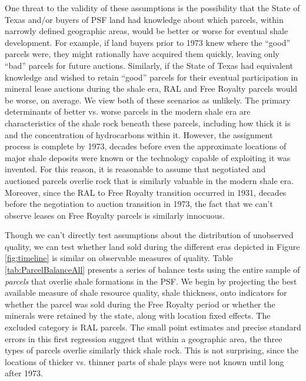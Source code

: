 One threat to the validity of these assumptions is the possibility that the State of Texas and/or buyers of PSF land had knowledge about which parcels, within narrowly defined geographic areas, would be better or worse for eventual shale development.  For example, if land buyers prior to 1973 knew where the ``good'' parcels were, they might rationally have acquired them quickly, leaving only ``bad'' parcels for future auctions.  Similarly, if the State of Texas had equivalent knowledge and wished to retain ``good'' parcels for their eventual participation in mineral lease auctions during the shale era, RAL and Free Royalty parcels would be worse, on average. We view both of these scenarios as unlikely. The primary determinants of better vs. worse parcels in the modern shale era are characteristics of the shale rock beneath these parcels, including how thick it is and the concentration of hydrocarbons within it.  However, the assignment process is complete by 1973, decades before even the approximate locations of major shale deposits were known or the technology capable of exploiting it was invented.  For this reason, it is reasonable to assume that negotiated and auctioned parcels overlie rock that is similarly valuable in the modern shale era.  Moreover, since the RAL to Free Royalty transition occurred in 1931, decades before the negotiation to auction transition in 1973, the fact that we can't observe leases on Free Royalty parcels is similarly innocuous.

Though we can't directly test assumptions about the distribution of unobserved quality, we can test whether land sold during the different eras depicted in Figure \ref{fig:timeline} is similar on observable measures of quality. Table \ref{tab:ParcelBalanceAll} presents a series of balance tests using the entire sample of \emph{parcels} that overlie shale formations in the PSF.  We begin by projecting the best available measure of shale resource quality, shale thickness, onto indicators for whether the parcel was sold during the Free Royalty period or whether the minerals were retained by the state, along with location fixed effects.  The excluded category is RAL parcels.  The small point estimates and precise standard errors in this first regression suggest that within a geographic area, the three types of parcels overlie similarly thick shale rock. This is not surprising, since the locations of thicker vs. thinner parts of shale plays were not known until long after 1973.

